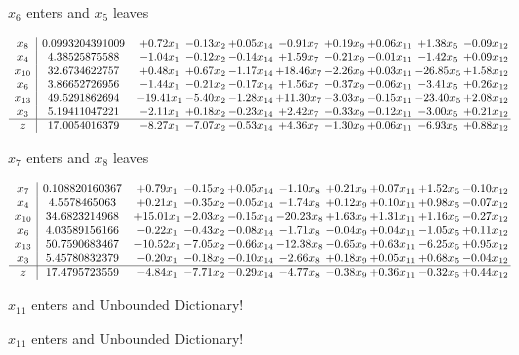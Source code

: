 \documentclass[9pt]{article}
\begin{document}
 $ x_{6} $ enters and $ x_{5} $ leaves 

 \[\begin{array}{c| c c@{\hskip 2pt} c@{\hskip 2pt} c@{\hskip 2pt} c@{\hskip 2pt} c@{\hskip 2pt} c@{\hskip 2pt} c@{\hskip 2pt} c@{\hskip 2pt} }
 x_{8}   &  0.0993204391009 & +  0.72 x_{1} & -0.13 x_{2} & +  0.05 x_{14} & -0.91 x_{7} & +  0.19 x_{9} & +  0.06 x_{11} & +  1.38 x_{5} & -0.09 x_{12}\\
 x_{4}   &  4.38525875588 & -1.04 x_{1} & -0.12 x_{2} & -0.14 x_{14} & +  1.59 x_{7} & -0.21 x_{9} & -0.01 x_{11} & -1.42 x_{5} & +  0.09 x_{12}\\
 x_{10}   &  32.6734622757 & +  0.48 x_{1} & +  0.67 x_{2} & -1.17 x_{14} & + 18.46 x_{7} & -2.26 x_{9} & +  0.03 x_{11} & -26.85 x_{5} & +  1.58 x_{12}\\
 x_{6}   &  3.86652726956 & -1.44 x_{1} & -0.21 x_{2} & -0.17 x_{14} & +  1.56 x_{7} & -0.37 x_{9} & -0.06 x_{11} & -3.41 x_{5} & +  0.26 x_{12}\\
 x_{13}   &  49.5291862694 & -19.41 x_{1} & -5.40 x_{2} & -1.28 x_{14} & + 11.30 x_{7} & -3.03 x_{9} & -0.15 x_{11} & -23.40 x_{5} & +  2.08 x_{12}\\
 x_{3}   &  5.19411047221 & -2.11 x_{1} & +  0.18 x_{2} & -0.23 x_{14} & +  2.42 x_{7} & -0.33 x_{9} & -0.12 x_{11} & -3.00 x_{5} & +  0.21 x_{12}\\
\hline
z    &  17.0054016379 & -8.27 x_{1} & -7.07 x_{2} & -0.53 x_{14} & +  4.36 x_{7} & -1.30 x_{9} & +  0.06 x_{11} & -6.93 x_{5} & +  0.88 x_{12}\\
\end{array}\]


 $ x_{7} $ enters and $ x_{8} $ leaves 

 \[\begin{array}{c| c c@{\hskip 2pt} c@{\hskip 2pt} c@{\hskip 2pt} c@{\hskip 2pt} c@{\hskip 2pt} c@{\hskip 2pt} c@{\hskip 2pt} c@{\hskip 2pt} }
 x_{7}   &  0.108820160367 & +  0.79 x_{1} & -0.15 x_{2} & +  0.05 x_{14} & -1.10 x_{8} & +  0.21 x_{9} & +  0.07 x_{11} & +  1.52 x_{5} & -0.10 x_{12}\\
 x_{4}   &  4.5578465063 & +  0.21 x_{1} & -0.35 x_{2} & -0.05 x_{14} & -1.74 x_{8} & +  0.12 x_{9} & +  0.10 x_{11} & +  0.98 x_{5} & -0.07 x_{12}\\
 x_{10}   &  34.6823214968 & + 15.01 x_{1} & -2.03 x_{2} & -0.15 x_{14} & -20.23 x_{8} & +  1.63 x_{9} & +  1.31 x_{11} & +  1.16 x_{5} & -0.27 x_{12}\\
 x_{6}   &  4.03589156166 & -0.22 x_{1} & -0.43 x_{2} & -0.08 x_{14} & -1.71 x_{8} & -0.04 x_{9} & +  0.04 x_{11} & -1.05 x_{5} & +  0.11 x_{12}\\
 x_{13}   &  50.7590683467 & -10.52 x_{1} & -7.05 x_{2} & -0.66 x_{14} & -12.38 x_{8} & -0.65 x_{9} & +  0.63 x_{11} & -6.25 x_{5} & +  0.95 x_{12}\\
 x_{3}   &  5.45780832379 & -0.20 x_{1} & -0.18 x_{2} & -0.10 x_{14} & -2.66 x_{8} & +  0.18 x_{9} & +  0.05 x_{11} & +  0.68 x_{5} & -0.04 x_{12}\\
\hline
z    &  17.4795723559 & -4.84 x_{1} & -7.71 x_{2} & -0.29 x_{14} & -4.77 x_{8} & -0.38 x_{9} & +  0.36 x_{11} & -0.32 x_{5} & +  0.44 x_{12}\\
\end{array}\]


 $ x_{11} $ enters and Unbounded Dictionary!


 $ x_{11} $ enters and Unbounded Dictionary!
\end{document}
